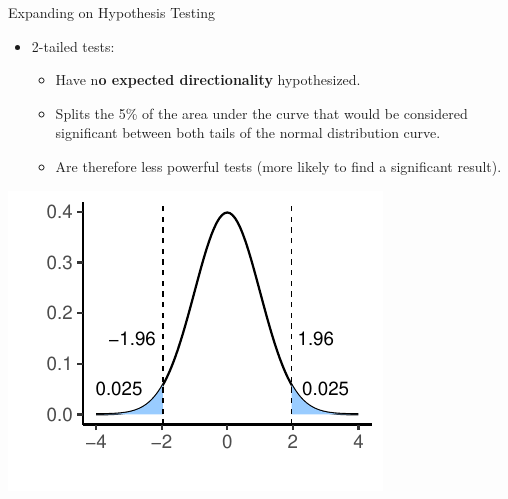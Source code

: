 \documentclass[
  ignorenonframetext,
]{beamer}
\providecommand{\tightlist}{%
  \setlength{\itemsep}{0pt}\setlength{\parskip}{0pt}}
\begin{document}
\begin{frame}{Expanding on Hypothesis Testing}
\label{expanding-on-hypothesis-testing-2}
\begin{itemize}
\tightlist
\item
  2-tailed tests:

  \begin{itemize}
  \tightlist
  \item
    Have n\textbf{o expected directionality} hypothesized.
  \item
    Splits the 5\% of the area under the curve that would be considered
    significant between both tails of the normal distribution curve.
  \item
    Are therefore less powerful tests (more likely to find a significant
    result).
  \end{itemize}
\end{itemize}

\centering

\includegraphics{Inferential-Stat-and-Z-test_files/figure-beamer/unnamed-chunk-5-1.pdf}\\
\end{frame}
\end{document}
